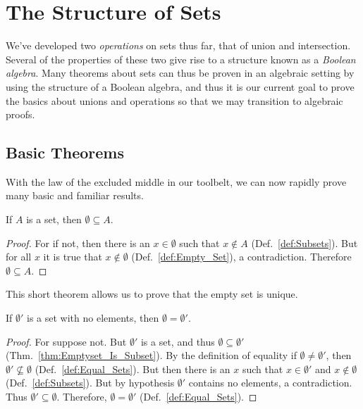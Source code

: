\section{The Structure of Sets}
    We've developed two \textit{operations} on sets thus
    far, that of union and intersection. Several of the properties of these two
    give rise to a structure known as a
    \textit{Boolean algebra}. Many theorems about sets
    can thus be proven in an algebraic setting by using the structure of a
    Boolean algebra, and thus it is our current goal to prove the basics about
    unions and operations so that we may transition to algebraic proofs.
    \subsection{Basic Theorems}
        With the law of the excluded middle in our toolbelt, we can now rapidly
        prove many basic and familiar results.
        \begin{theorem}
            \label{thm:Emptyset_Is_Subset}%
            If $A$ is a set, then $\emptyset\subseteq{A}$.
        \end{theorem}
        \begin{proof}
            For if not, then there is an $x\in\emptyset$ such that
            $x\notin{A}$ (Def.~\ref{def:Subsets}). But for all $x$ it is true
            that $x\notin\emptyset$ (Def.~\ref{def:Empty_Set}), a contradiction.
            Therefore $\emptyset\subseteq{A}$.
        \end{proof}
        This short theorem allows us to prove that the empty set is unique.
        \begin{theorem}
            \label{thm:Empty_Set_is_Unique}%
            If $\emptyset'$ is a set with no elements, then
            $\emptyset=\emptyset'$.
        \end{theorem}
        \begin{proof}
            For suppose not. But $\emptyset'$ is a set, and thus
            $\emptyset\subseteq\emptyset'$ (Thm.~\ref{thm:Emptyset_Is_Subset}).
            By the definition of equality if $\emptyset\ne\emptyset'$,
            then $\emptyset'\nsubseteq\emptyset$ (Def.~\ref{def:Equal_Sets}).
            But then there is an $x$ such that $x\in\emptyset'$ and
            $x\notin\emptyset$ (Def.~\ref{def:Subsets}). But by hypothesis
            $\emptyset'$ contains no elements, a contradiction. Thus
            $\emptyset'\subseteq\emptyset$. Therefore, $\emptyset=\emptyset'$
            (Def.~\ref{def:Equal_Sets}).
        \end{proof}
